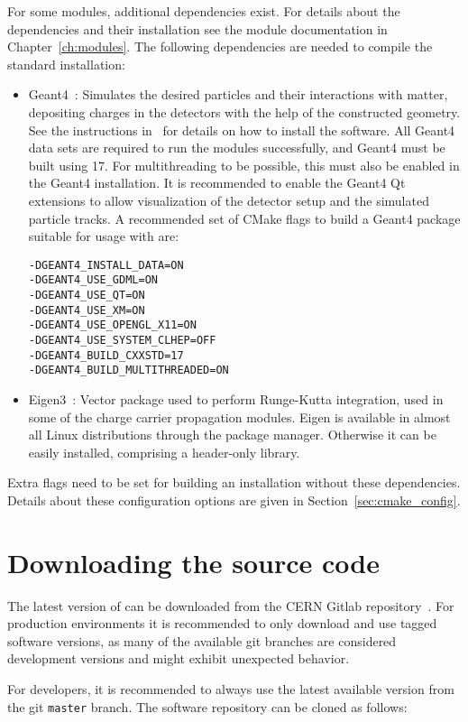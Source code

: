 For some modules, additional dependencies exist.
For details about the dependencies and their installation see the module documentation in Chapter~\ref{ch:modules}.
The following dependencies are needed to compile the standard installation:
\begin{itemize}
\item Geant4~\cite{geant4}: Simulates the desired particles and their interactions with matter, depositing charges in the detectors with the help of the constructed geometry.
See the instructions in~\cite{geant4installation} for details on how to install the software.
All Geant4 data sets are required to run the modules successfully, and Geant4 must be built using {\CPP}17. For multithreading to be possible, this must also be enabled in the Geant4 installation.
It is recommended to enable the Geant4 Qt extensions to allow visualization of the detector setup and the simulated particle tracks.
A recommended set of CMake flags to build a Geant4 package suitable for usage with \apsq are:
\begin{verbatim}
-DGEANT4_INSTALL_DATA=ON
-DGEANT4_USE_GDML=ON
-DGEANT4_USE_QT=ON
-DGEANT4_USE_XM=ON
-DGEANT4_USE_OPENGL_X11=ON
-DGEANT4_USE_SYSTEM_CLHEP=OFF
-DGEANT4_BUILD_CXXSTD=17
-DGEANT4_BUILD_MULTITHREADED=ON
\end{verbatim}
\item Eigen3~\cite{eigen3}: Vector package used to perform Runge-Kutta integration, used in some of the charge carrier propagation modules.
Eigen is available in almost all Linux distributions through the package manager.
Otherwise it can be easily installed, comprising a header-only library.
\end{itemize}
Extra flags need to be set for building an \apsq installation without these dependencies.
Details about these configuration options are given in Section~\ref{sec:cmake_config}.

\section{Downloading the source code}
The latest version of \apsq can be downloaded from the CERN Gitlab repository~\cite{ap2-repo}.
For production environments it is recommended to only download and use tagged software versions, as many of the available git branches are considered development versions and might exhibit unexpected behavior.

For developers, it is recommended to always use the latest available version from the git \texttt{master} branch.
The software repository can be cloned as follows:

